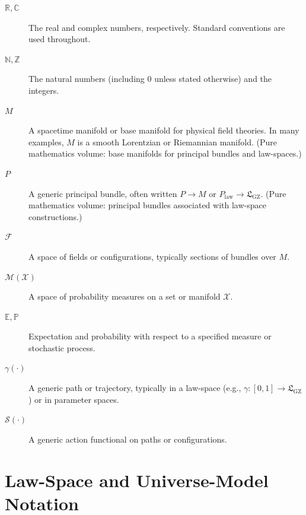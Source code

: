 \documentclass[11pt]{book}
\newcommand{\GZLS}{\ensuremath{\mathfrak{L}_{\mathrm{GZ}}}}
\newcommand{\Base}{\ensuremath{M}}
\newcommand{\Bundle}{\ensuremath{P}}
\theoremstyle{plain}
\theoremstyle{definition}
\theoremstyle{remark}
\begin{document}
\begin{description}
  \item[$\mathbb{R},\mathbb{C}$]
    The real and complex numbers, respectively. Standard conventions
    are used throughout.
  \item[$\mathbb{N},\mathbb{Z}$]
    The natural numbers (including $0$ unless stated otherwise) and
    the integers.
  \item[$\Base$]
    A spacetime manifold or base manifold for physical field
    theories. In many examples, $\Base$ is a smooth Lorentzian or
    Riemannian manifold. (Pure mathematics volume: base manifolds
    for principal bundles and law-spaces.)
  \item[$\Bundle$]
    A generic principal bundle, often written
    $\Bundle \to \Base$ or
    $\Bundle_{\mathrm{law}} \to \GZLS$. (Pure mathematics volume:
    principal bundles associated with law-space constructions.)
  \item[$\mathcal{F}$]
    A space of fields or configurations, typically sections of
    bundles over $\Base$.
  \item[$\mathcal{M}(\mathcal{X})$]
    A space of probability measures on a set or manifold
    $\mathcal{X}$.
  \item[$\mathbb{E},\mathbb{P}$]
    Expectation and probability with respect to a specified measure
    or stochastic process.
  \item[$\gamma(\cdot)$]
    A generic path or trajectory, typically in a law-space
    (e.g., $\gamma\colon[0,1]\to\GZLS$) or in parameter spaces.
  \item[$\mathcal{S}(\cdot)$]
    A generic action functional on paths or configurations.
\end{description}

\section*{Law-Space and Universe-Model Notation}
\end{document}

